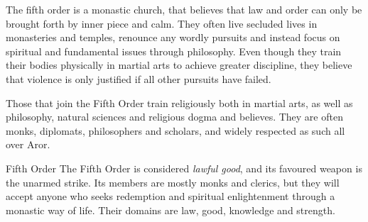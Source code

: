 The fifth order is a monastic church, that believes that law and order can only
be brought forth by inner piece and calm. They often live secluded lives in
monasteries and temples, renounce any wordly pursuits and instead focus on
spiritual and fundamental issues through philosophy. Even though they train
their bodies physically in martial arts to achieve greater discipline, they
believe that violence is only justified if all other pursuits have failed.

Those that join the Fifth Order train religiously both in martial arts, as well
as philosophy, natural sciences and religious dogma and believes. They are often
monks, diplomats, philosophers and scholars, and widely respected as such all
over Aror.

\begin{35e}{Fifth Order}
  The Fifth Order is considered \emph{lawful good}, and its favoured weapon is
  the unarmed strike. Its members are mostly monks and clerics, but they will
  accept anyone who seeks redemption and spiritual enlightenment through a
  monastic way of life. Their domains are law, good, knowledge and strength.
\end{35e}
